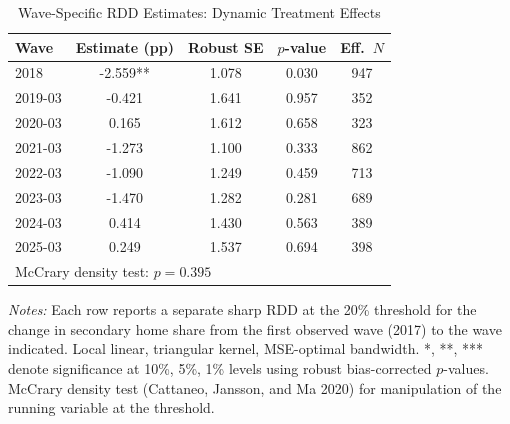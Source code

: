 \begin{table}[htbp]
\centering
\begin{threeparttable}
\caption{Wave-Specific RDD Estimates: Dynamic Treatment Effects}
\label{tab:eventstudy}
\begin{tabular}{lcccc}
\toprule
Wave & Estimate (pp) & Robust SE & $p$-value & Eff.\ $N$ \\
\midrule
2018 & -2.559** & 1.078 & 0.030 & 947 \\
2019-03 & -0.421 & 1.641 & 0.957 & 352 \\
2020-03 & 0.165 & 1.612 & 0.658 & 323 \\
2021-03 & -1.273 & 1.100 & 0.333 & 862 \\
2022-03 & -1.090 & 1.249 & 0.459 & 713 \\
2023-03 & -1.470 & 1.282 & 0.281 & 689 \\
2024-03 & 0.414 & 1.430 & 0.563 & 389 \\
2025-03 & 0.249 & 1.537 & 0.694 & 398 \\
\midrule
\multicolumn{5}{l}{McCrary density test: $p = 0.395$} \\
\bottomrule
\end{tabular}
\begin{tablenotes}[flushleft]
\small
\item \textit{Notes:} Each row reports a separate sharp RDD at the 20\% threshold for the change in secondary home share from the first observed wave (2017) to the wave indicated. Local linear, triangular kernel, MSE-optimal bandwidth. *, **, *** denote significance at 10\%, 5\%, 1\% levels using robust bias-corrected $p$-values. McCrary density test (Cattaneo, Jansson, and Ma 2020) for manipulation of the running variable at the threshold.
\end{tablenotes}
\end{threeparttable}
\end{table}
